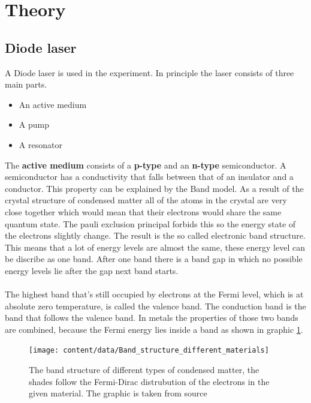 \section{Theory}
\label{sec:Theorie}

\subsection{Diode laser}

A Diode laser is used in the experiment.
In principle the laser consists of three main parts.
\begin{itemize}
    \item An active medium
    \item A pump
    \item A resonator
\end{itemize}
The \textbf{active medium} consists of a \textbf{p-type} and an \textbf{n-type} semiconductor.
A semiconductor has a conductivity that falls between that of an insulator and a conductor.
This property can be explained by the Band model. 
As a result of the crystal structure of condensed matter all of the atoms in the crystal are very close together which would mean that their electrons would share the same quantum state.
The pauli exclusion principal forbids this so the energy state of the electrons slightly change.
The result is the so called electronic band structure.
This means that a lot of energy levels are almost the same, these energy level can be discribe as one band.
After one band there is a band gap in which no possible energy levels lie after the gap next band starts.
\\\\
The highest band that's still occupied by electrons at the Fermi level, which is at absolute zero temperature, is called the valence band.
The conduction band is the band that follows the valence band.
In metals the properties of those two bands are combined, because the Fermi energy lies inside a band as shown in graphic \ref{fig:band_structure}.

\begin{figure}
    \centering
    \caption{The band structure of different types of condensed matter, the shades follow the Fermi-Dirac distrubution of the electrons in the given material. The graphic is taken from source \cite{wikipedia_valence_conduction_band}}
    \texttt{[image: content/data/Band\_structure\_different\_materials]}
    \label{fig:band_structure}
\end{figure}

